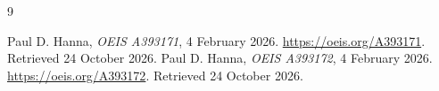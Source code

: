\documentclass[11pt,a4paper]{article}
\theoremstyle{remark}
\begin{document}
\begin{thebibliography}{9}
\raggedright
{}
Paul D. Hanna, \emph{OEIS A393171}, 4 February 2026.
\url{https://oeis.org/A393171}. Retrieved 24 October 2026.
Paul D. Hanna, \emph{OEIS A393172}, 4 February 2026.
\url{https://oeis.org/A393172}. Retrieved 24 October 2026.
\end{thebibliography}
\end{document}
